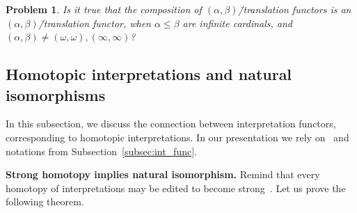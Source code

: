 \documentclass[12pt]{article}
\newtheorem{problem}{Problem}
\theoremstyle{definition}
\begin{document}
\begin{problem}
Is it true that the composition of $(\alpha,\beta)$\=/translation functors is an $(\alpha,\beta)$\=/translation functor, when $\alpha\leqslant\beta$ are infinite cardinals, and $(\alpha,\beta)\ne (\omega,\omega), (\infty,\infty)$?
\end{problem}

\subsection{Homotopic interpretations and natural isomorphisms}\label{subsec:hom}

In this subsection, we discuss the connection between interpretation functors, corresponding to homotopic interpretations. In our presentation we rely on~\cite[Subsection~3.1]{Th_int1} and notations from Subsection~\ref{subsec:int_func}.

{\bf Strong homotopy implies natural isomorphism.} 
Remind that every homotopy of interpretations may be edited to become strong~\cite[Remark~19]{Th_int1}. Let us prove the following theorem.
\end{document}
